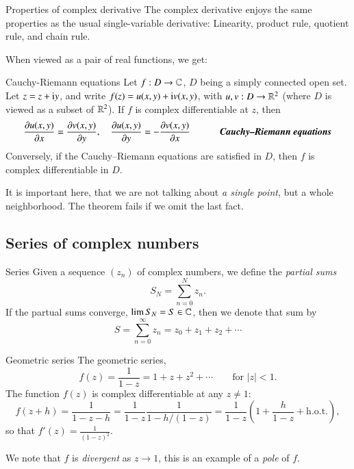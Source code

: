 \begin{myTheorem}{Properties of complex derivative}{}
    The complex derivative enjoys the same properties as the usual single-variable derivative: Linearity, product rule, quotient rule, and chain rule.
\end{myTheorem}

When viewed as a pair of real functions, we get:
\begin{myTheorem}{Cauchy-Riemann equations}{}
    Let $f : D \to \mathbb{C}$, $D$ being a simply connected open set.
    Let $z = z + \mathrm{i} y$, and write $f(z) = u(x,y) + \mathrm{i} v(x,y)$, with $u,v : D \to \mathbb{R}^2$ (where $D$ is viewed as a subset of $\mathbb{R}^2$). If $f$ is complex differentiable at $z$, then
    \begin{equation}
        \pdiff{u(x,y)}{x} = \pdiff{v(x,y)}{y}, \quad         \pdiff{u(x,y)}{y} = -\pdiff{v(x,y)}{x} \text{\axiomname{Cauchy--Riemann equations}}
    \end{equation}
    Conversely, if the Cauchy--Riemann equations are satisfied in $D$, then $f$ is complex differentiable in $D$.
\end{myTheorem}

It is important here, that we are not talking about \emph{a single point}, but a whole neighborhood. The theorem fails if we omit the last fact.


\subsection{Series of complex numbers}

\begin{myDefinition}{Series}{}
Given a sequence $(z_n)$ of complex numbers, we define the \emph{partial sums}
\begin{equation}
    S_N = \sum_{n=0}^N z_n.
\end{equation}
If the partual sums converge, $\lim S_N = S \in \mathbb{C}$, then we denote that sum by
\begin{equation}
    S = \sum_{n=0}^\infty z_n = z_0 + z_1 + z_2 + \cdots
\end{equation}
\end{myDefinition}

\begin{myExample}{Geometric series}{}
The geometric series,
\begin{equation}
   f(z) =  \frac{1}{1-z} = 1 + z + z^2 + \cdots \qquad \text{for $|z| < 1$}.
\end{equation}
The function $f(z)$ is complex differentiable at any $z \neq 1$:
\begin{equation}
    f(z + h) = \frac{1}{1-z-h} = \frac{1}{1-z} \frac{1}{1 - h/(1-z)} = \frac{1}{1-z}(1 + \frac{h}{1-z} + \text{h.o.t.}),
\end{equation}
so that $f'(z) = \frac{1}{(1-z)^2}$.

We note that $f$ is \emph{divergent} as $z\to 1$, this is an example of a \emph{pole} of $f$.
\end{myExample}


